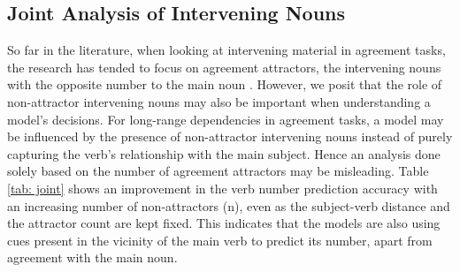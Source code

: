 \documentclass[11pt,a4paper]{article}
\begin{document}
\subsection{Joint Analysis of Intervening Nouns}
\label{subsec:Joint analysis}
So far in the literature, when looking at intervening material in agreement tasks, the research has tended to focus on agreement attractors, the intervening nouns with the opposite number to the main noun \cite{kuncoro-etal-2018-lstms}. However, we posit that the role of non-attractor intervening nouns may also be important when understanding a model's decisions. For long-range dependencies in agreement tasks, a model may be influenced by the presence of non-attractor intervening nouns instead of purely capturing the verb's relationship with the main subject. Hence an analysis done solely based on the number of agreement attractors may be misleading. 
Table \ref{tab: joint} shows an improvement in the verb number prediction accuracy with an increasing number of non-attractors (n), even as the subject-verb distance and the attractor count are kept fixed. This indicates that the models are also using cues present in the vicinity of the main verb to predict its number, apart from agreement with the main noun.

\begin{table}[!ht]
    \centering
    \caption{Number prediction \% accuracy with an increasing number of non-attractor intervening nouns (n). The distance between the main subject and the corresponding verb is held constant at 7 and the attractor count at 1.}
    \label{tab: joint}
\end{table}
\end{document}
